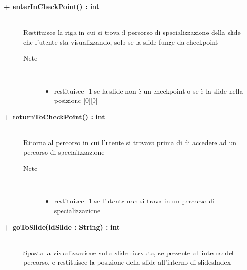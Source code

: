 \begin{description}
\begin{description}
	\end{description}
	
	
	\begin{description}
		\item[\textbf{\color{blue}+ enterInCheckPoint() : int			}] \hfill \\
			Restituisce la riga in cui si trova il percorso di specializzazione della slide che l'utente sta visualizzando, solo se la slide funge da checkpoint
			
		\begin{description}
			
			\item[Note] \hfill \\	
				\begin{itemize}
					\item restituisce -1 se la slide non è un checkpoint o se è la slide nella posizione [0][0]
				\end{itemize}
		\end{description}
			
	\end{description}
	
	\begin{description}
		\item[\textbf{\color{blue}+ returnToCheckPoint() : int			}] \hfill \\
			Ritorna al percorso in cui l'utente si trovava prima di di accedere ad un percorso di specializzazione
			
		\begin{description}
			
			\item[Note] \hfill \\	
				\begin{itemize}
					\item restituisce -1 se l'utente non si trova in un percorso di specializzazione
				\end{itemize}
		\end{description}
			
	\end{description}
	
	\begin{description}
		\item[\textbf{\color{blue}+ goToSlide(idSlide : String) : int			}] \hfill \\
			Sposta la visualizzazione sulla slide ricevuta, se presente all'interno del percorso, e restituisce la posizione della slide all'interno di slidesIndex
			

\end{description}
\end{description}
